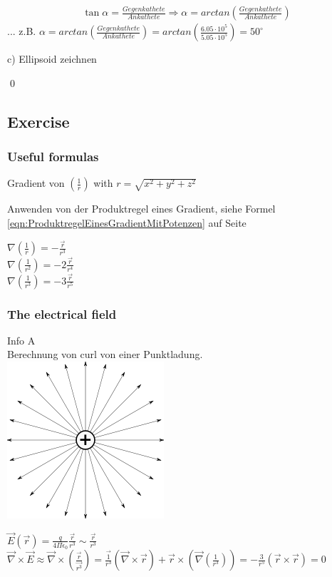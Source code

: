 \begin{align}
\tan{\alpha}=\frac{Gegenkathete}{Ankathete} \Rightarrow \alpha=arctan(\frac{Gegenkathete}{Ankathete})
\end{align}
... z.B. $ \alpha=arctan(\frac{Gegenkathete}{Ankathete}) = arctan(\frac{6.05 \cdot 10^5}{5.05 \cdot 10^5}) = 50^\circ $


c) Ellipsoid zeichnen



\qed


\subsection{Exercise}
\subsubsection{Useful formulas}

Gradient von $ (\frac{1}{r}) $  with $ r=\sqrt{x^2+y^2+z^2} $

Anwenden von der Produktregel eines Gradient, siehe Formel \ref{eqn:ProduktregelEinesGradientMitPotenzen} auf Seite \pageref{eqn:ProduktregelEinesGradientMitPotenzen}

$ \nabla(\frac{1}{r}) = -\frac{\vec{r}}{r^3}$
\\
$ \nabla(\frac{1}{r^2}) = -2\frac{\vec{r}}{r^4}$
\\
$ \nabla(\frac{1}{r^3}) = -3\frac{\vec{r}}{r^5}$

\subsubsection{The electrical field}

Info A\\
Berechnung von curl von einer Punktladung.\\ \includegraphics[scale=0.2]{images/punktladung.png}
\label{fig:Punktladung}

$ \vec{E}(\vec{r})=\frac{q}{4\Pi\epsilon_0}\frac{\vec{r}}{r^3}\sim \frac{\vec{r}}{r^3} $
\\
$ \vec{\nabla}\times\vec{E}\approx\vec{\nabla}\times(\frac{\vec{r}}{\vec{r^3}})=\frac{\vec{1}}{r^3}(\vec{\nabla}\times\vec{r})+\vec{r}\times(\vec{\nabla}(\frac{1}{r^3}))=-\frac{3}{r^5}(\vec{r}\times\vec{r})=0 $

